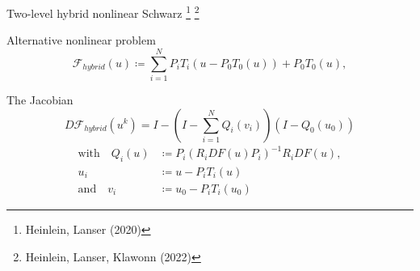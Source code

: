 \begin{frame}{Two-level hybrid nonlinear Schwarz  \footnote[2]{\tiny Heinlein, Lanser (2020)} \footnote[3]{\tiny Heinlein, Lanser, Klawonn (2022)}}
	\vspace*{-5mm}
	\begin{block}{\normalsize Alternative nonlinear problem}
		\begin{equation*}
			\mathcal{F}_{hybrid}(u) \coloneqq \sum_{i=1}^NP_iT_i(u-P_0T_0(u)) + P_0T_0(u),
		\end{equation*}
	\end{block}
	\begin{block}{\normalsize The Jacobian}
		\vspace*{-2mm}
		\begin{equation*}
			D\mathcal{F}_{hybrid}(u^k) = I - \left(I-\sum_{i=1}^NQ_i(v_i)\right)(I-Q_0(u_0))
		\end{equation*}
		\begin{align*}
			\text{with}\quad Q_i(u) & \coloneqq P_i(R_iDF(u)P_i)^{-1}R_iDF(u), \\
			u_i                     & \coloneqq u-P_iT_i(u)                    \\
			\text{and}\quad v_i     & \coloneqq u_0-P_iT_i(u_0)
		\end{align*}
	\end{block}
\end{frame}
